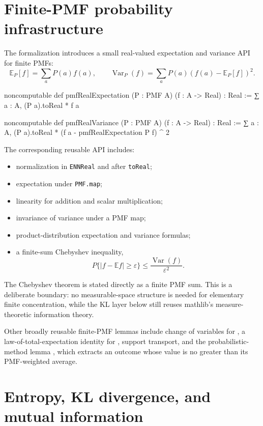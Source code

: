\documentclass[11pt]{article}
\newcommand{\E}{\mathbb{E}}
\newcommand{\Var}{\operatorname{Var}}
\begin{document}
\section{Finite-PMF probability infrastructure}

The formalization introduces a small real-valued expectation and variance API
for finite PMFs:
\[
  \E_P[f]=\sum_a P(a)f(a),\qquad
  \Var_P(f)=\sum_a P(a)(f(a)-\E_P[f])^2.
\]

\begin{LeanCode}
noncomputable def pmfRealExpectation
    (P : PMF A) (f : A -> Real) : Real :=
  ∑ a : A, (P a).toReal * f a

noncomputable def pmfRealVariance
    (P : PMF A) (f : A -> Real) : Real :=
  ∑ a : A, (P a).toReal *
    (f a - pmfRealExpectation P f) ^ 2
\end{LeanCode}

The corresponding reusable API includes:
\begin{itemize}
  \item normalization in \texttt{ENNReal} and after \texttt{to\allowbreak Real};
  \item expectation under \texttt{PMF.map};
  \item linearity for addition and scalar multiplication;
  \item invariance of variance under a PMF map;
  \item product-distribution expectation and variance formulas;
  \item a finite-sum Chebyshev inequality,
  \[
    P\{|f-\E f|\ge\varepsilon\}
      \le \frac{\Var(f)}{\varepsilon^2}.
  \]
\end{itemize}

The Chebyshev theorem is stated directly as a finite PMF sum.  This is a
deliberate boundary: no measurable-space structure is needed for elementary
finite concentration, while the KL layer below still reuses mathlib's
measure-theoretic information theory.

Other broadly reusable finite-PMF lemmas include change of variables for
, a law-of-total-expectation identity for , support
transport, and the probabilistic-method lemma
, which extracts an outcome whose value
is no greater than its PMF-weighted average.

\section{Entropy, KL divergence, and mutual information}
\end{document}
